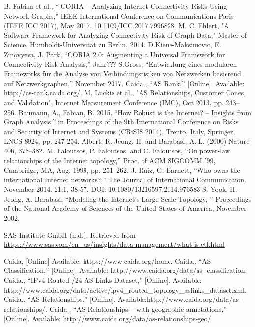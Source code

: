\documentclass[conference, 11pt]{IEEEtran}
\begin{document}
\begin{thebibliography}{00}
B. Fabian et al., `` CORIA – Analyzing Internet Connectivity Risks Using Network Graphs,'' IEEE International Conference on Communications Paris (IEEE ICC 2017), May 2017. 10.1109/ICC.2017.7996828. 
M. C. Ehlert, "A Software Framework for Analyzing Connectivity Risk of Graph Data," Master of Science, Humboldt-Universität zu Berlin, 2014. 
 D.Kiene-Maksimovic, E. Zinovyeva, J. Park, ``CORIA 2.0: Augmenting a Universal Framework for Connectivity Risk Analysis,'' Jahr???
S.Gross, ``Entwicklung eines modularen Frameworks für die Analyse von Verbindungsrisiken von Netzwerken basierend auf Netzwerkgraphen,'' November 2017.
 Caida., ``AS Rank,'' [Online]. Available: http://as-rank.caida.org/.
M. Luckie et al., "AS Relationships, Customer Cones, and Validation", Internet Measurement Conference (IMC), Oct 2013, pp. 243--256.
Baumann, A., Fabian, B. 2015. “How Robust is the Internet? – Insights
from Graph Analysis,” in Proceedings of the 9th International
Conference on Risks and Security of Internet and Systems (CRiSIS
2014), Trento, Italy, Springer, LNCS 8924, pp. 247-254.
Albert, R. Jeong, H. and Barabasi, A.-L. (2000) Nature 406, 378–382.
 M. Faloutsos, P. Faloutsos, and C. Faloutsos, “On power-law relationships of the Internet topology,” Proc. of ACM SIGCOMM ’99, Cambridge, MA, Aug. 1999, pp. 251–262.
J. Ruiz, G. Barnett, ``Who owns the international Internet networks?,'' The Journal of International
Communication. November 2014. 21:1, 38-57, DOI:
10.1080/13216597.2014.976583
S. Yook, H. Jeong, A. Barabasi, ``Modeling the Internet's Large-Scale Topology, '' Proceedings of the National Academy of Sciences of the 
United States of America, November 2002.

SAS Institute GmbH (n.d.). Retrieved from \url{https://www.sas.com/en_us/insights/data-management/what-is-etl.html}



Caida, [Online] Available: https://www.caida.org/home.
Caida., ``AS Classification,'' [Online]. Available: http://www.caida.org/data/as-
classification.
Caida., ``IPv4 Routed /24 AS Links Dataset,'' [Online]. Available: http://www.caida.org/data/active/ipv4\_routed\_topology\_aslinks\_dataset.xml.
Caida., ``AS Relationships,'' [Online]. Available:http://www.caida.org/data/as-relationships/.
Caida., ``AS Relationships -- with geographic annotations,'' [Online]. Available: http://www.caida.org/data/as-relationships-geo/.



\end{thebibliography}
\end{document}
